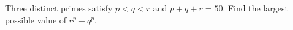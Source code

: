 Three distinct primes satisfy $p<q<r$ and $p+q+r=50$. Find the largest possible value of $r^p-q^p$.
